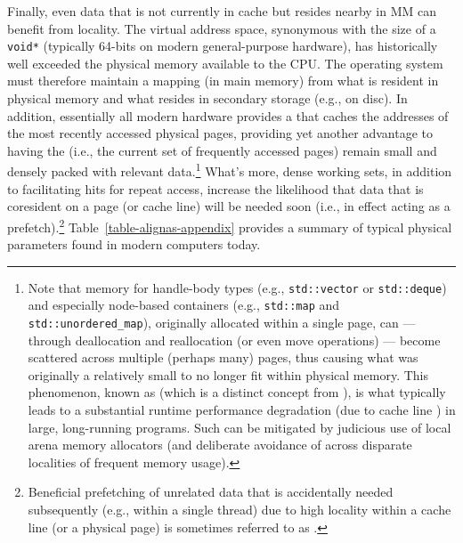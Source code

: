 Finally, even data that is not currently in cache but resides nearby in
MM can benefit from locality. The virtual address space, synonymous with
the size of a \lstinline!void*! (typically 64-bits on modern general-purpose hardware), has historically well exceeded the physical memory
available to the CPU. The operating system must therefore maintain a
mapping (in main memory) from what is resident in physical memory and
what resides in secondary storage (e.g., on disc). In addition,
essentially all modern hardware provides a
 that caches the addresses of the
most recently accessed physical pages, providing yet another advantage
to having the  (i.e., the current set of frequently
accessed pages) remain small and densely packed with relevant
data.{\cprotect\footnote{Note that memory for handle-body
types (e.g., \lstinline!std::vector! or \lstinline!std::deque!) and
especially node-based containers (e.g., \lstinline!std::map! and
\lstinline!std::unordered_map!), originally allocated within a single
page, can --- through deallocation and reallocation (or even move
operations) --- become scattered across multiple (perhaps many)
 pages, thus causing what was originally a relatively small 
to no longer fit within physical memory. This phenomenon, known as
 (which is a distinct concept from
), is what typically leads to a substantial
runtime performance degradation (due to cache line ) in large,
long-running programs. Such  can be mitigated by
judicious use of local arena memory allocators (and deliberate
avoidance of  across disparate localities of
  frequent memory usage).}} What's more, dense working sets, in addition
to facilitating hits for repeat access, increase the likelihood that
data that is coresident on a page (or cache line) will be needed soon
(i.e., in effect acting as a prefetch).{\cprotect\footnote{Beneficial prefetching of unrelated data that
is accidentally needed subsequently (e.g., within a single thread) due
to high locality within a cache line (or a physical page) is sometimes referred to as
  .}} Table~\ref{table-alignas-appendix} provides a summary of typical physical parameters found in modern computers today.

